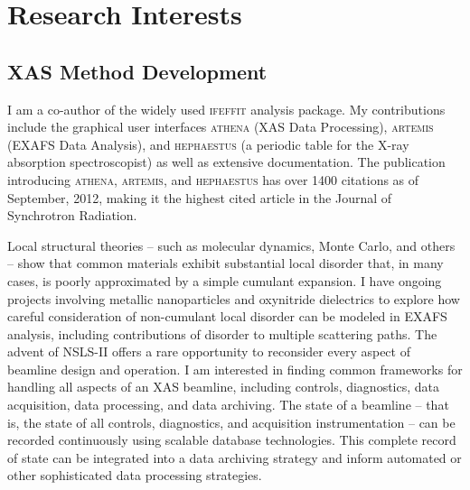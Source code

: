 \documentclass[11pt]{moderncv}
\begin{document}
\section{Research Interests}

\subsection{XAS Method Development}
%
{I am a co-author of the widely used \textsc{ifeffit} analysis
  package.  My contributions include the graphical user interfaces
  \textsc{athena} (XAS Data Processing), \textsc{artemis} (EXAFS Data
  Analysis), and \textsc{hephaestus} (a periodic table for the X-ray
  absorption spectroscopist) as well as extensive documentation.
  \newline{} The publication introducing \textsc{athena},
  \textsc{artemis}, and \textsc{hephaestus} has over 1400 citations as
  of September, 2012, making it the highest cited article in the Journal of
  Synchrotron Radiation.}

%
{Local structural theories -- such as molecular dynamics, Monte Carlo,
  and others -- show that common materials exhibit substantial local
  disorder that, in many cases, is poorly approximated by a simple
  cumulant expansion.  I have ongoing projects involving metallic
  nanoparticles and oxynitride dielectrics to explore how careful
  consideration of non-cumulant local disorder can be modeled in EXAFS
  analysis, including contributions of disorder to multiple scattering
  paths.}
%
%
{The advent of NSLS-II offers a rare opportunity to reconsider every
  aspect of beamline design and operation.  I am interested in finding
  common frameworks for handling all aspects of an XAS beamline,
  including controls, diagnostics, data acquisition, data processing,
  and data archiving.  The state of a beamline -- that is, the state
  of all controls, diagnostics, and acquisition instrumentation -- can
  be recorded continuously using scalable database technologies.  This
  complete record of state can be integrated into a data archiving
  strategy and inform automated or other sophisticated data processing
  strategies.}
\end{document}
